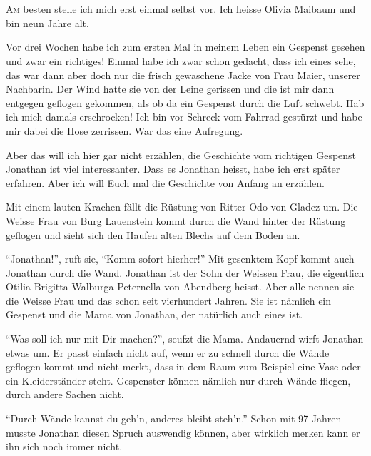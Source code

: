 \chapter*{}
\begin{mdframed}[style=mystyle]
\lettrine[lines=3]{\color{DeepPink}A}{m} besten stelle ich mich erst einmal selbst vor. Ich heisse Olivia Maibaum und bin neun Jahre alt. 

Vor drei Wochen habe ich zum ersten Mal in meinem Leben ein Gespenst gesehen
und zwar ein richtiges! Einmal habe ich zwar schon gedacht, dass ich eines
sehe, das war dann aber doch nur die frisch gewaschene Jacke von Frau Maier,
unserer Nachbarin. Der Wind hatte sie von der Leine gerissen und die ist mir
dann entgegen geflogen gekommen, als ob da ein Gespenst durch die Luft schwebt.
Hab ich mich damals erschrocken! Ich bin vor Schreck vom Fahrrad gestürzt und
habe mir dabei die Hose zerrissen.  War das eine Aufregung.

Aber das will ich hier gar nicht erzählen, die Geschichte vom richtigen Gespenst Jonathan ist viel interessanter.  Dass es Jonathan heisst, habe ich erst später erfahren. Aber ich will Euch mal die Geschichte von Anfang an erzählen.
\end{mdframed}

Mit einem lauten Krachen fällt die Rüstung von Ritter Odo von Gladez um. Die Weisse Frau von Burg Lauenstein kommt durch die Wand hinter der Rüstung geflogen und sieht sich den Haufen alten Blechs auf dem Boden an.

\enquote{Jonathan!}, ruft sie, \enquote{Komm sofort hierher!} Mit gesenktem Kopf kommt auch Jonathan durch die Wand. Jonathan ist der Sohn der Weissen Frau, die eigentlich Otilia Brigitta Walburga Peternella von Abendberg heisst. Aber alle nennen sie die Weisse Frau und das schon seit vierhundert Jahren. Sie ist nämlich ein Gespenst und die Mama von Jonathan, der natürlich auch eines ist. 

\enquote{Was soll ich nur mit Dir machen?}, seufzt die Mama. Andauernd wirft Jonathan etwas um. Er passt einfach nicht auf, wenn er zu schnell durch die Wände geflogen kommt und nicht merkt, dass in dem Raum zum Beispiel eine Vase oder ein Kleiderständer steht. Gespenster können nämlich nur durch Wände fliegen, durch andere Sachen nicht. 

\enquote{Durch Wände kannst du geh'n, anderes bleibt steh'n.} Schon mit 97 Jahren musste Jonathan diesen Spruch auswendig können, aber wirklich merken kann er ihn sich noch immer nicht. 

